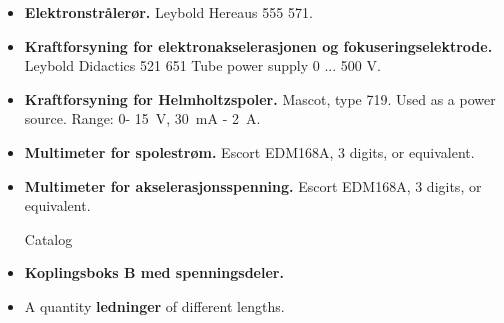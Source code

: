 \documentclass[../Elmag-labhefte-2020.tex]{subfiles}
\begin{document}
\vspace{-4mm}
\begin{itemize}
    \item \textbf{Elektronstrålerør.} Leybold Hereaus 555 571.
    \item \textbf{Kraftforsyning for elektronakselerasjonen og fokuseringselektrode.} Leybold Didactics 521 651 Tube power supply 0 ... 500 V.
    
    \item \textbf{Kraftforsyning for Helmholtzspoler.} Mascot, type 719. Used as a power source.
    Range: 0- \SI{15}{\volt}, \SI{30}{\milli\ampere} - \SI{2}{\ampere}.
    \item \textbf{Multimeter for spolestrøm.} Escort EDM168A, 3 digits, or equivalent.
    \item \textbf{Multimeter for akselerasjonsspenning.} Escort EDM168A, 3 digits, or equivalent.
   
    Catalog \item \textbf{Koplingsboks B med spenningsdeler.}
    \item A quantity \textbf{ledninger} of different lengths.
\end{itemize}
\end{document}
